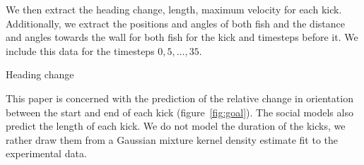 \documentclass[nobib, a4paper]{tufte-handout}
\begin{document}
We then extract the heading change, length, maximum velocity for each kick.
Additionally, we extract the positions and angles of both fish and the distance and angles towards the wall for both fish for the kick and timesteps before it.
We include this data for the timesteps \(0, 5, \ldots, 35 \).

\begin{marginfigure}
    \centering
{} 
\caption{Heading change}
\label{fig:goal}
\end{marginfigure}

This paper is concerned with the prediction of the relative change in orientation between the start and end of each kick (figure~\ref{fig:goal}).
The social models also predict the length of each kick.
We do not model the duration of the kicks, we rather draw them from a Gaussian mixture kernel density estimate fit to the experimental data.
\end{document}

